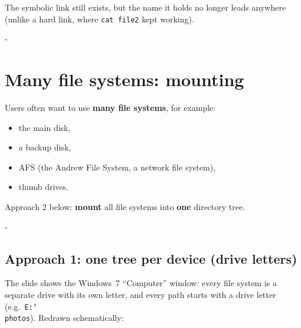 \documentclass[11pt,a4paper]{article}
\makeatletter
\newcommand{\keepspace}[1]{\par\penalty-100\begingroup
  \setlength{\dimen@}{#1}\dimen@ii\pagegoal\advance\dimen@ii-\pagetotal
  \ifdim\dimen@>\dimen@ii\ifdim\dimen@ii>\z@\vfil\fi\break\fi\endgroup}
\makeatother
\begin{document}
The symbolic link still exists, but the name it holds no longer leads
anywhere (unlike a hard link, where \texttt{cat file2} kept working).

\keepspace{7\baselineskip}
\section{Many file systems: mounting}

Users often want to use \textbf{many file systems}, for example:
\begin{itemize}
  \item the main disk,
  \item a backup disk,
  \item AFS (the Andrew File System, a network file system),
  \item thumb drives.
\end{itemize}

\begin{quizbox}
Approach 2 below: \textbf{mount} all file systems into \textbf{one}
directory tree.
\end{quizbox}

\keepspace{7\baselineskip}
\subsection{Approach 1: one tree per device (drive letters)}

The slide shows the Windows~7 ``Computer'' window: every file system is a
separate drive with its own letter, and every path starts with a drive
letter (e.g.\ \texttt{E:\char`\\photos}). Redrawn schematically:
\end{document}
